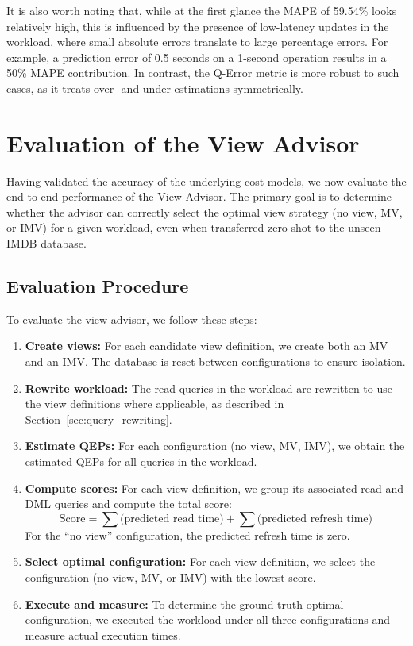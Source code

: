 It is also worth noting that, while at the first glance the MAPE of 59.54\% looks relatively high, this is influenced by the presence of low-latency updates in the workload, where small absolute errors translate to large percentage errors. For example, a prediction error of 0.5 seconds on a 1-second operation results in a 50\% MAPE contribution. In contrast, the Q-Error metric is more robust to such cases, as it treats over- and under-estimations symmetrically.

\section{Evaluation of the View Advisor}
\label{sec:eval_view_advisor}

Having validated the accuracy of the underlying cost models, we now evaluate the end-to-end performance of the View Advisor. The primary goal is to determine whether the advisor can correctly select the optimal view strategy (no view, \ac{MV}, or \ac{IMV}) for a given workload, even when transferred zero-shot to the unseen IMDB database.

\subsection{Evaluation Procedure}
\label{sec:view_advisor_procedure}

To evaluate the view advisor, we follow these steps:
\begin{enumerate}
    \item \textbf{Create views:} For each candidate view definition, we create both an \ac{MV} and an \ac{IMV}. The database is reset between configurations to ensure isolation.
    \item \textbf{Rewrite workload:} The read queries in the workload are rewritten to use the view definitions where applicable, as described in Section~\ref{sec:query_rewriting}.
    \item \textbf{Estimate \ac{QEP}s:} For each configuration (no view, \ac{MV}, \ac{IMV}), we obtain the estimated \ac{QEP}s for all queries in the workload.
    \item \textbf{Compute scores:} For each view definition, we group its associated read and \ac{DML} queries and compute the total score:
    \[
    \text{Score} = \sum \text{(predicted read time)} + \sum \text{(predicted refresh time)}
    \]
    For the ``no view'' configuration, the predicted refresh time is zero.
    \item \textbf{Select optimal configuration:} For each view definition, we select the configuration (no view, \ac{MV}, or \ac{IMV}) with the lowest score.
    \item \textbf{Execute and measure:} To determine the ground-truth optimal configuration, we executed the workload under all three configurations and measure actual execution times.
\end{enumerate}

